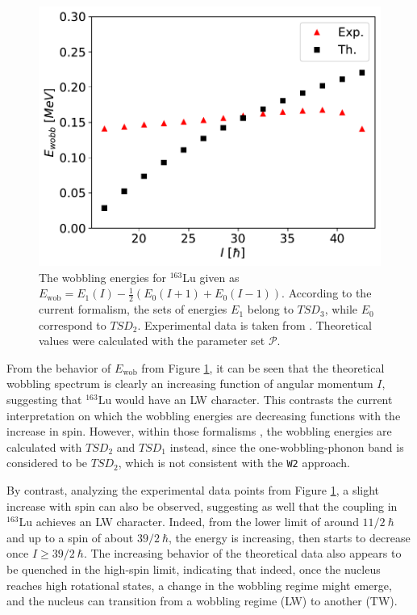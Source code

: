 \documentclass[11pt]{article}
\begin{document}
\begin{figure}
    \centering
    \includegraphics[scale=0.65]{figs/wobbling_energy_ThExp.pdf}
    \caption{The wobbling energies for $^{163}$Lu given as $E_\text{wob}=E_1(I)-\frac{1}{2}(E_0(I+1)+E_0(I-1))$. According to the current formalism, the sets of energies $E_1$ belong to $TSD_3$, while $E_0$ correspond to $TSD_2$. Experimental data is taken from \cite{reich2010nuclear}. Theoretical values were calculated with the parameter set $\mathcal{P}$.}
    \label{wobbling-energies_th_exp}
\end{figure}

From the behavior of $E_\text{wob}$ from Figure \ref{wobbling-energies_th_exp}, it can be seen that the theoretical wobbling spectrum is clearly an increasing function of angular momentum $I$, suggesting that $^{163}$Lu would have an LW character. This contrasts the current interpretation on which the wobbling energies are decreasing functions with the increase in spin. However, within those formalisms \cite{frauendorf2014transverse,frauendorf2018comment}, the wobbling energies are calculated with $TSD_2$ and $TSD_1$ instead, since the one-wobbling-phonon band is considered to be $TSD_2$, which is not consistent with the \texttt{W2} approach.

By contrast, analyzing the experimental data points from Figure \ref{wobbling-energies_th_exp}, a slight increase with spin can also be observed, suggesting as well that the coupling in $^{163}$Lu achieves an LW character. Indeed, from the lower limit of around $11/2\ \hbar$ and up to a spin of about $39/2\ \hbar$, the energy is increasing, then starts to decrease once $I\geq39/2\ \hbar$. The increasing behavior of the theoretical data also appears to be quenched in the high-spin limit, indicating that indeed, once the nucleus reaches high rotational states, a change in the wobbling regime might emerge, and the nucleus can transition from a wobbling regime (LW) to another (TW).
\end{document}
